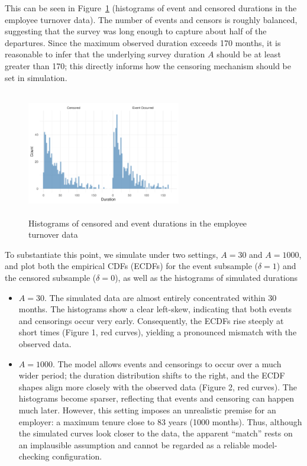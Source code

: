 This can be seen in Figure~\ref{fig:离职数据分开的直方图} (histograms of event and censored durations in the employee turnover data). The number of events and censors is roughly balanced, suggesting that the survey was long enough to capture about half of the departures. Since the maximum observed duration exceeds 170 months, it is reasonable to infer that the underlying survey duration $A$ should be at least greater than 170; this directly informs how the censoring mechanism should be set in simulation.
\begin{figure}[H]
    \centering
    \includegraphics[height=5.5cm, width=0.6\textwidth]{images/separate_hist.png}
    \caption{Histograms of censored and event durations in the employee turnover data}
    \label{fig:离职数据分开的直方图}
\end{figure}
To substantiate this point, we simulate under two settings, $A=30$ and $A=1000$, and plot both the empirical CDFs (ECDFs) for the event subsample ($\delta=1$) and the censored subsample ($\delta=0$), as well as the histograms of simulated durations
\begin{itemize}
    \item $A=30$. The simulated data are almost entirely concentrated within 30 months. The histograms show a clear left-skew, indicating that both events and censorings occur very early. Consequently, the ECDFs rise steeply at short times (Figure 1, red curves), yielding a pronounced mismatch with the observed data.
    \item $A=1000$. The model allows events and censorings to occur over a much wider period; the duration distribution shifts to the right, and the ECDF shapes align more closely with the observed data (Figure 2, red curves). The histograms become sparser, reflecting that events and censoring can happen much later. However, this setting imposes an unrealistic premise for an employer: a maximum tenure close to 83 years (1000 months). Thus, although the simulated curves look closer to the data, the apparent “match” rests on an implausible assumption and cannot be regarded as a reliable model-checking configuration.
\end{itemize}
